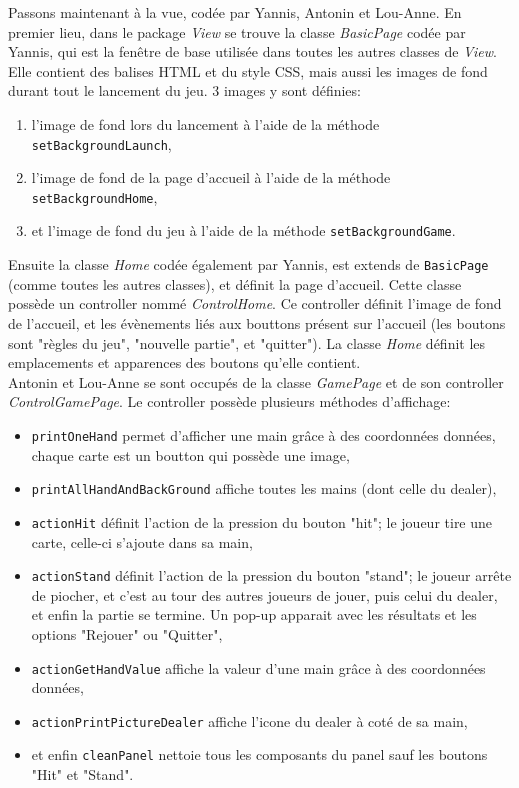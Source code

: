 \documentclass[french,12pt]{article}
\begin{document}
Passons maintenant à la vue, codée par Yannis, Antonin et Lou-Anne. En premier lieu, dans le package \textsl{View} se trouve la classe \textsl{BasicPage} codée par Yannis, qui est la fenêtre de base utilisée dans toutes les autres classes de \textsl{View}. Elle contient des balises HTML et du style CSS, mais aussi les images de fond durant tout le lancement du jeu. 3 images y sont définies:
\begin{enumerate}
	\item l'image de fond lors du lancement à l'aide de la méthode 
		  \texttt{setBackgroundLaunch},
	\item l'image de fond de la page d'accueil à l'aide de la méthode
		  \texttt{setBackgroundHome},
	\item et l'image de fond du jeu à l'aide de la méthode
		  \texttt{setBackgroundGame}.\\
\end{enumerate}

Ensuite la classe \textsl{Home} codée également par Yannis, est extends de \texttt{BasicPage} (comme toutes les autres classes), et définit la page d'accueil. Cette classe possède un controller nommé \textsl{ControlHome}. Ce controller définit l'image de fond de l'accueil, et les évènements liés aux bouttons présent sur l'accueil (les boutons sont "règles du jeu", "nouvelle partie", et "quitter"). La classe \textsl{Home} définit les emplacements et apparences des boutons qu'elle contient.\\

Antonin et Lou-Anne se sont occupés de la classe \textsl{GamePage} et de son controller \textsl{ControlGamePage}. Le controller possède plusieurs méthodes d'affichage:
\begin{itemize}
	\item \texttt{printOneHand} permet d'afficher une main grâce à des
		  coordonnées données, chaque carte est un boutton qui possède une
		  image,
	\item \texttt{printAllHandAndBackGround} affiche toutes les mains (dont
		  celle du dealer),
	\item \texttt{actionHit} définit l'action de la pression du bouton
		  "hit"; le joueur tire une carte, celle-ci s'ajoute dans sa main,
	\item \texttt{actionStand} définit l'action de la pression du bouton
		  "stand"; le joueur arrête de piocher, et c'est au tour des autres
		  joueurs de jouer, puis celui du dealer, et enfin la partie se
		  termine. Un pop-up apparait avec les résultats et les options
		  "Rejouer" ou "Quitter",
	\item \texttt{actionGetHandValue} affiche la valeur d'une main grâce à
		  des coordonnées données,
	\item \texttt{actionPrintPictureDealer} affiche l'icone du dealer à
		  coté de sa main,
	\item et enfin \texttt{cleanPanel} nettoie tous les composants du panel
		  sauf les boutons "Hit" et "Stand".\\
\end{itemize}
\end{document}
